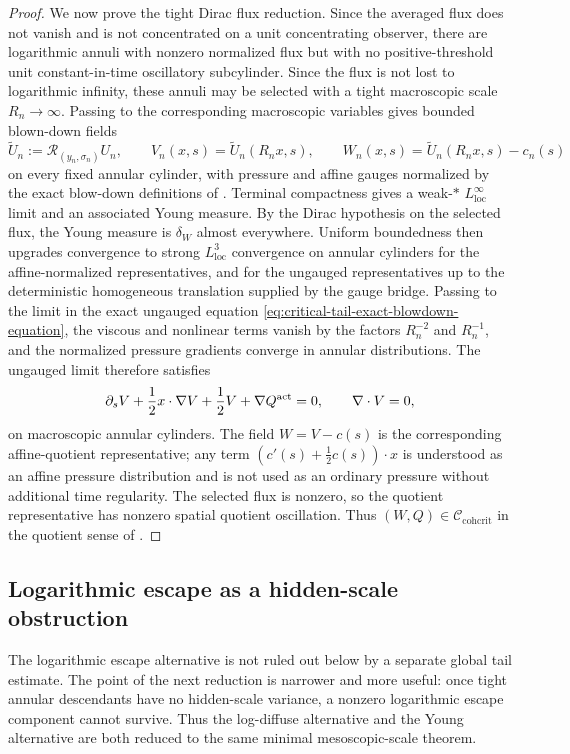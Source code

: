 \documentclass[11pt]{amsart}
\numberwithin{equation}{section}
\theoremstyle{plain}
\theoremstyle{definition}
\theoremstyle{remark}
\newcommand{\loc}{\mathrm{loc}}
\newcommand{\calR}{\mathcal R}
\newcommand{\Ccohcrit}{\mathcal C_{\mathrm{cohcrit}}}
\begin{document}
\begin{proof}
We now prove the tight Dirac flux reduction.  Since the averaged flux does not
vanish and is not concentrated on a unit concentrating observer, there are logarithmic
annuli with nonzero normalized flux but with no positive-threshold unit
constant-in-time oscillatory subcylinder.  Since the flux is not lost to logarithmic
infinity, these annuli may be selected with a tight macroscopic scale
\(R_n\to\infty\).  Passing to the corresponding macroscopic variables gives
bounded blown-down fields
\[
   \widetilde U_n:=\calR_{(y_n,\sigma_n)}U_n,\qquad
   V_n(x,s)=\widetilde U_n(R_nx,s),\qquad
   W_n(x,s)=\widetilde U_n(R_nx,s)-c_n(s)
\]
on every fixed annular cylinder, with pressure and affine gauges normalized by
the exact blow-down definitions of .
Terminal compactness gives a
weak-\(*\) \(L^\infty_{\loc}\) limit and an associated Young measure.  By the
Dirac hypothesis on the selected flux, the Young measure is
\(\delta_W\) almost everywhere.  Uniform boundedness then upgrades convergence
to strong \(L^3_{\loc}\) convergence on annular cylinders for the
affine-normalized representatives, and for the ungauged representatives up to
the deterministic homogeneous translation supplied by the gauge bridge.  Passing
to the limit in the exact ungauged equation
\eqref{eq:critical-tail-exact-blowdown-equation}, the viscous and nonlinear
terms vanish by the factors \(R_n^{-2}\) and \(R_n^{-1}\), and the normalized
pressure gradients converge in annular distributions.  The ungauged limit
therefore satisfies
\[
   \partial_s V+\frac12x\cdot\nabla V+\frac12V+\nabla Q^{\rm act}=0,
   \qquad \nabla\cdot V=0,
\]
on macroscopic annular cylinders.  The field \(W=V-c(s)\) is the corresponding
affine-quotient representative; any term \((c'(s)+\tfrac12c(s))\cdot x\) is
understood as an affine pressure distribution and is not used as an ordinary
pressure without additional time regularity.  The selected flux is nonzero, so
the quotient representative has nonzero spatial quotient oscillation.  Thus
\((W,Q)\in\Ccohcrit\) in the quotient sense of
.
\end{proof}

\subsection{Logarithmic escape as a hidden-scale obstruction}
\label{subsec:logarithmic-escape-hidden-scale}

The logarithmic escape alternative is not ruled out below by a separate global
tail estimate.  The point of the next reduction is narrower and more useful:
once tight annular descendants have no hidden-scale variance, a nonzero
logarithmic escape component cannot survive.  Thus the log-diffuse alternative and
the Young alternative are both reduced to the same minimal mesoscopic-scale
theorem.
\end{document}
